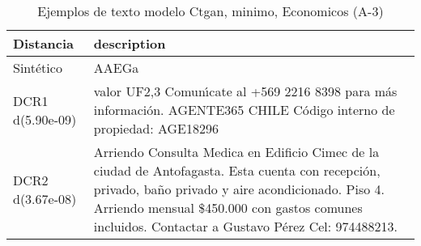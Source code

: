 \begin{table}[H]
\centering
\fontsize{10}{14}\selectfont
\caption{Ejemplos de texto modelo Ctgan, minimo, Economicos (A-3)}
\label{table-example-economicos-a-3-ctgan-min-text}
\begin{tabular}{|l|m{35em}|}
\hline
\rowcolor[gray]{0.8}
Distancia & description \\
\hline Sintético & AAEGa \\
\hline DCR1 d(5.90e-09) & valor UF2,3 Comun{\'\i}cate al +569 2216 8398 para m\'as informaci\'on. AGENTE365 CHILE C\'odigo interno de propiedad: AGE18296 \\
\hline DCR2 d(3.67e-08) & Arriendo Consulta Medica en Edificio Cimec de la ciudad de Antofagasta. Esta cuenta con recepci\'on, privado, ba\~no privado y aire acondicionado. Piso 4. Arriendo mensual \$450.000 con gastos comunes incluidos.
Contactar a Gustavo P\'erez Cel: 974488213. \\
\hline
\end{tabular}
\end{table}

